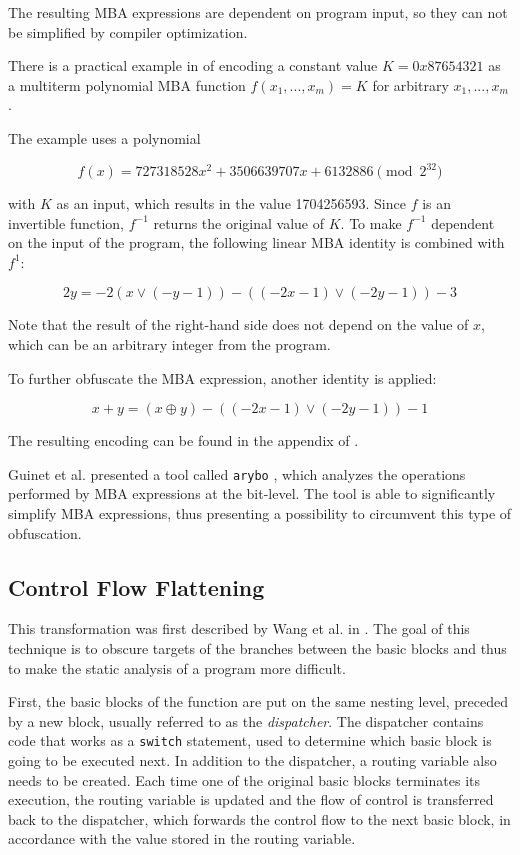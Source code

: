 \documentclass[
  digital, %
  table,   %
  twoside, %
  nolof,     %
  nolot,     %
]{fithesis3}
\theoremstyle{definition}
\begin{document}
The resulting MBA expressions are dependent on program input, so they can not be simplified by compiler optimization. 

There is a practical example in \cite{mba_zhou} of encoding a constant value $K=0x87654321$ as a multiterm polynomial MBA function $f(x_1,...,x_m) = K$ for arbitrary $x_1,...,x_m$.

The example uses a polynomial

$$ f(x) = 727318528x^2 + 3506639707x + 6132886 \pmod{2^{32}}$$

with $K$ as an input, which results in the value 1704256593. Since $f$ is an invertible function, $f^{-1}$ returns the original value of $K$. To make $f^{-1}$ dependent on the input of the program, the following linear MBA identity is combined with $f^1$:

$$2y = -2(x \vee(-y-1))-((-2x-1)\vee(-2y-1))-3$$

Note that the result of the right-hand side does not depend on the value of $x$, which can be an arbitrary integer from the program.  

To further obfuscate the MBA expression, another identity is applied:

$$x + y = (x\oplus y) - ((-2x-1)\vee(-2y-1))-1$$

The resulting encoding can be found in the appendix of \cite{mba_zhou}.

Guinet et al. presented a tool called \texttt{arybo} \cite{guinet_arybo}, which analyzes the operations performed by MBA expressions at the bit-level. The tool is able to significantly simplify MBA expressions, thus presenting a possibility to circumvent this type of obfuscation. 

\subsection{Control Flow Flattening} \label{flatten}

This transformation was first described by Wang et al. in \cite{wang2001protection}. The goal of this technique is to obscure targets of the branches between the basic blocks and thus to make the static analysis of a program more difficult. 

First, the basic blocks of the function are put on the same nesting level, preceded by a new block, usually referred to as the \textit{dispatcher}. The dispatcher contains code that works as a \texttt{switch} statement, used to determine which basic block is going to be executed next. In addition to the dispatcher, a routing variable also needs to be created. Each time one of the original basic blocks terminates its execution, the routing variable is updated and the flow of control is transferred back to the dispatcher, which forwards the control flow to the next basic block, in accordance with the value stored in the routing variable. 
\end{document}
